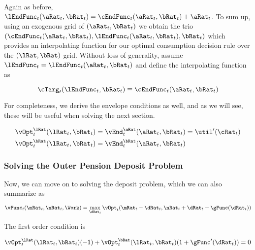 \documentclass[\econtexRoot/SequentialEGM]{subfiles}
\begin{document}
Again as before, $\lEndFunc_{t}(\aRat_{t}, \bRat_{t}) =
        \cEndFunc_{t}(\aRat_{t}, \bRat_{t}) + \aRat_{t}$. To sum up, using an
exogenous
grid of $(\aRat_{t}, \bRat_{t})$ we obtain the trio $(\cEndFunc_{t}(\aRat_{t},
        \bRat_{t}), \lEndFunc_{t}(\aRat_{t},
        \bRat_{t}), \bRat_{t})$ which
provides an
interpolating function for our optimal consumption decision rule over the
$(\lRat, \bRat)$ grid. Without loss of generality, assume $\lEndFunc_{t} =
        \lEndFunc_{t}(\aRat_{t}, \bRat_{t})$ and define the interpolating
function as

\begin{equation}
        \cTarg_{t}(\lEndFunc_{t}, \bRat_{t}) \equiv \cEndFunc_{t}(\aRat_{t},
        \bRat_{t})
\end{equation}

For completeness, we derive the envelope conditions as well, and as we will
see, these will be useful when solving the next section.

\begin{equation}
        \begin{split}
                \vOpt_{t}^{\lRat}(\lRat_{t}, \bRat_{t}) & =
                \vEnd_{t}^{\aRat}(\aRat_{t}, \bRat_{t}) = \util'(\cRat_{t}) \\
                \vOpt_{t}^{\bRat}(\lRat_{t}, \bRat_{t}) & =
                \vEnd_{t}^{\bRat}(\aRat_{t}, \bRat_{t})
        \end{split}
\end{equation}

\subsubsection{Solving the Outer Pension Deposit Problem}

Now, we can move on to solving the deposit problem, which we can also summarize
as

\begin{equation}
        \vFunc_{t}(\mRat_{t}, \nRat_{t}, \Work) = \max_{\dRat_{t}}
        \vOpt_{t}(\mRat_{t}
        - \dRat_{t}, \nRat_{t} + \dRat_{t} + \gFunc(\dRat_{t}))
\end{equation}

The first order condition is

\begin{equation}
        \vOpt_{t}^{\lRat}(\lRat_{t}, \bRat_{t})(-1) +
        \vOpt_{t}^{\bRat}(\lRat_{t}, \bRat_{t})(1+\gFunc'(\dRat_{t})) = 0
\end{equation}
\end{document}
